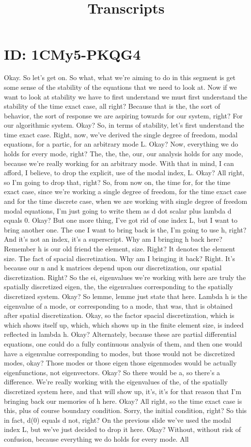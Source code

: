 \documentclass[10pt]{article}
\title{Transcripts}
\date{}
\begin{document}
\section*{ID: 1CMy5-PKQG4}
Okay. So let's get on. So what, what we're aiming to do in this segment is get some sense of the stability of the equations that we need to look at. Now if we want to look at stability we have to first understand we must first understand the stability of the time exact case, all right? Because that is the, the sort of behavior, the sort of response we are aspiring towards for our system, right? For our algorithmic system. Okay? So, in terms of stability, let's first understand the time exact case. Right, now, we've derived the single degree of freedom, modal equations, for a partic, for an arbitrary mode L. Okay? Now, everything we do holds for every mode, right? The, the, the, our, our analysis holds for any mode, because we're really working for an arbitrary mode. With that in mind, I can afford, I believe, to drop the explicit, use of the modal index, L. Okay? All right, so I'm going to drop that, right? So, from now on, the time for, for the time exact case, since we're working a single degree of freedom, for the time exact case and for the time discrete case, when we are working with single degree of freedom modal equations, I'm just going to write them as d dot scalar plus lambda d equals 0. Okay? But one more thing, I've got rid of one index L, but I want to bring another one. The one I want to bring back is the, I'm going to use h, right? And it's not an index, it's a superscript. Why am I bringing h back here? Remember h is our old friend the element, size. Right? It denotes the element size. The fact of spacial discretization. Why am I bringing it back? Right. It's because our n and k matrices depend upon our discretization, our spatial discretization. Right? So the ei, eigenvalues we're working with here are truly the spatially discretized eigen, the, the eigenvalues corresponding to the spatially discretized system. Okay? So lemme, lemme just state that here. Lambda h is the eigenvalue of a mode, or corresponding to a mode, that was, that is obtained after spatial discretization. Okay, so the factor spacial discretization, which is which shows itself up, which, which shows up in the finite element size, is indeed reflected in lambda h. Okay? Alternately, because these are partial differential equations, one could do a fully continuous analysis of them, and then one would have a eigenvalue corresponding to modes, but those would not be discretized modes, okay? Those modes or those eigen those eigenmodes would be actually eigenfunctions, not eigenvectors. Okay? So there would be a, so there's a difference. We're really working with the eigenvalues of the, of the spatially discretized system here, and that will show up, it's, it's for that reason that I'm bringing back our memories of h here. Okay? All right, so the time exact case is this, plus of course boundary condition. Sorry, the initial condition, right? So this in fact, d(0) equals d not, right? On the previous slide we've used the modal index L, but we've just decided to drop it here. Okay? Without, without risk of confusion, because everything we do holds for every mode. All 
\end{document}
